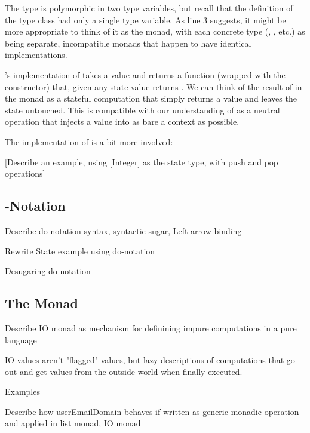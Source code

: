 The  type is polymorphic in two type variables, but recall that the definition of the  type class
had only a single type variable. As line 3 suggests, it might be more appropriate to think of it as the  monad,
with each concrete type (, , etc.) as being separate, incompatible monads that
happen to have identical implementations.

's implementation of  takes a value  and returns a function (wrapped with the  constructor)
that, given any state value  returns . We can think of the result of  in the  monad as a
stateful computation that simply returns a value and leaves the state untouched. This is compatible with our understanding of 
as a neutral operation that injects a value into as bare a context as possible. 

The implementation of \code{(>>=)} is a bit more involved:

\begin{notelist}
    \item [Describe the types of the two operands, State h and f]
    \item [Describe let clause, bindings for intermediate values]
    \item [Describe the result]
\end{notelist}

[Describe an example, using [Integer] as the state type, with push and pop operations]

\subsection{-Notation}

\begin{notelist}
    \item Describe do-notation syntax, syntactic sugar, Left-arrow binding
    \item Rewrite State example using do-notation
    \item Desugaring do-notation
\end{notelist}

\subsection{The  Monad}

\begin{notelist}
    \item Describe IO monad as mechanism for definining impure computations in a pure language
    \item IO values aren't "flagged" values, but lazy descriptions of computations that go out and get values from
          the outside world when finally executed.
    \item Examples
    \item Describe how userEmailDomain behaves if written as generic monadic operation and applied in list monad, IO monad
\end{notelist}

